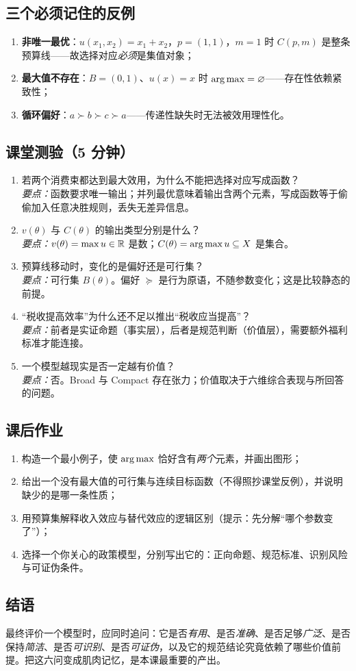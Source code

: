 \subsection{三个必须记住的反例}
\begin{enumerate}
  \item \textbf{非唯一最优}：$u(x_1,x_2)=x_1+x_2$，$p=(1,1)$，$m=1$ 时 $C(p,m)$ 是整条预算线——故选择对应\emph{必须}是集值对象；
  \item \textbf{最大值不存在}：$B=(0,1)$、$u(x)=x$ 时 $\operatorname*{arg\,max}=\varnothing$——存在性依赖紧致性；
  \item \textbf{循环偏好}：$a\succ b\succ c\succ a$——传递性缺失时无法被效用理性化。
\end{enumerate}

\subsection{课堂测验（5 分钟）}
\begin{enumerate}
  \item 若两个消费束都达到最大效用，为什么不能把选择对应写成函数？\\
        \emph{要点：}函数要求唯一输出；并列最优意味着输出含两个元素，写成函数等于偷偷加入任意决胜规则，丢失无差异信息。
  \item $v(\theta)$ 与 $C(\theta)$ 的输出类型分别是什么？\\
        \emph{要点：}$v(\theta)=\max u\in\mathbb{R}$ 是数；$C(\theta)=\operatorname*{arg\,max} u\subseteq X$ 是集合。
  \item 预算线移动时，变化的是偏好还是可行集？\\
        \emph{要点：}可行集 $B(\theta)$。偏好 $\succeq$ 是行为原语，不随参数变化；这是比较静态的前提。
  \item “税收提高效率”为什么还不足以推出“税收应当提高”？\\
        \emph{要点：}前者是实证命题（事实层），后者是规范判断（价值层），需要额外福利标准才能连接。
  \item 一个模型越现实是否一定越有价值？\\
        \emph{要点：}否。Broad 与 Compact 存在张力；价值取决于六维综合表现与所回答的问题。
\end{enumerate}

\subsection{课后作业}
\begin{enumerate}
  \item 构造一个最小例子，使 $\operatorname*{arg\,max}$ 恰好含有\emph{两个}元素，并画出图形；
  \item 给出一个没有最大值的可行集与连续目标函数（不得照抄课堂反例），并说明缺少的是哪一条性质；
  \item 用预算集解释收入效应与替代效应的逻辑区别（提示：先分解“哪个参数变了”）；
  \item 选择一个你关心的政策模型，分别写出它的：正向命题、规范标准、识别风险与可证伪条件。
\end{enumerate}

\subsection{结语}

最终评价一个模型时，应同时追问：它是否\emph{有用}、是否\emph{准确}、是否足够\emph{广泛}、是否保持\emph{简洁}、是否\emph{可识别}、是否\emph{可证伪}，以及它的规范结论究竟依赖了哪些价值前提。把这六问变成肌肉记忆，是本课最重要的产出。

